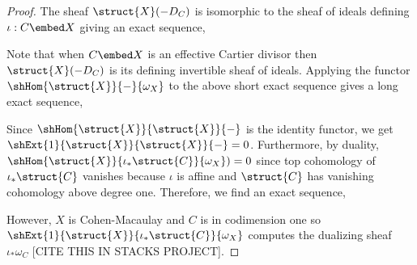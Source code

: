 \documentclass[12pt]{article}
\begin{document}
\begin{proof}
The sheaf $\struct{X}(-D_C)$ is isomorphic to the sheaf of ideals defining $\iota : C \embed X$ giving an exact sequence,
\begin{center}
\end{center}
Note that when $C \embed X$ is an effective Cartier divisor then $\struct{X}(-D_C)$ is its defining invertible sheaf of ideals.
Applying the functor $\shHom{\struct{X}}{-}{\omega_X}$ to the above short exact sequence gives a long exact sequence,
\begin{center}
\end{center}
Since $\shHom{\struct{X}}{\struct{X}}{-}$ is the identity functor, we get $\shExt{1}{\struct{X}}{\struct{X}}{-} = 0$. Furthermore, by duality, $\shHom{\struct{X}}{\iota_* \struct{C}}{\omega_X}) = 0$ since top cohomology of $\iota_* \struct{C}$ vanishes because $\iota$ is affine and $\struct{C}$ has vanishing cohomology above degree one. Therefore, we find an exact sequence,
\begin{center}
\end{center}
However, $X$ is Cohen-Macaulay and $C$ is in codimension one so $\shExt{1}{\struct{X}}{\iota_* \struct{C}}{\omega_X}$ computes the dualizing sheaf $\iota_* \omega_C$ [CITE THIS IN STACKS PROJECT].


\end{proof}
\end{document}
